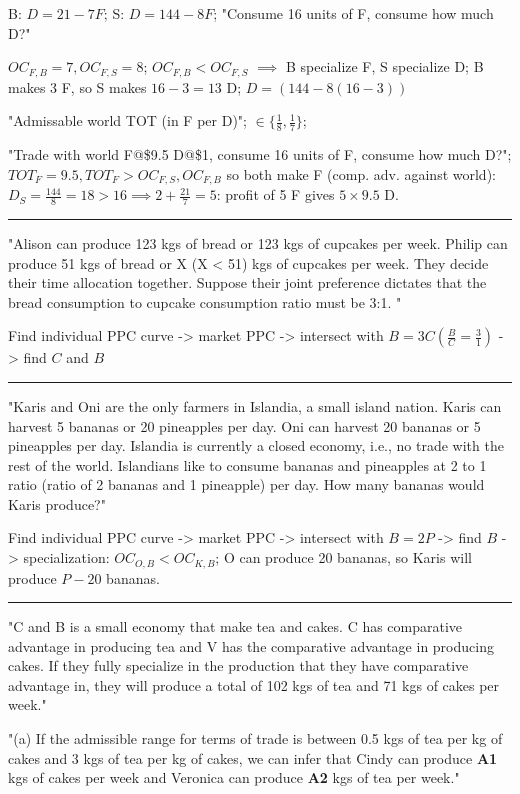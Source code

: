 \documentclass[a4paper]{article}
\begin{document}
\begin{multicols*}{3}
    B: $D = 21 − 7F$; S: $D = 144 - 8F$; "Consume 16 units of F, consume how much D?"


    $OC_{F,B}=7, OC_{F,S}=8$; $OC_{F,B} < OC_{F,S}$ $\implies$ B specialize F, S specialize D; B makes 3 F, so S makes $16-3=13$ D; $D=(144-8(16-3))$

    "Admissable world TOT (in F per D)"; $\in \{\frac{1}{8}, \frac{1}{7}\}$;

    "Trade with world F@\$9.5 D@\$1, consume 16 units of F, consume how much D?"; $TOT_F=9.5, TOT_F>OC_{F,S},OC_{F,B}$ so both make F (comp. adv. against world): $D_S=\frac{144}{8}=18>16 \implies 2 + \frac{21}{7} = 5$: profit of 5 F gives $5\times9.5$ D.

    \rule{1\linewidth}{0.4pt}

    "Alison can produce 123 kgs of bread or 123 kgs of cupcakes per week. Philip can produce 51 kgs of bread or X (X < 51) kgs of cupcakes per week. They decide their time allocation together. Suppose their joint preference dictates that the bread consumption to cupcake consumption ratio must be 3:1. "

    Find individual PPC curve -> market PPC -> intersect with $B=3C (\frac{B}{C}=\frac31)$ -> find $C$ and $B$

    \rule{1\linewidth}{0.4pt}

    "Karis and Oni are the only farmers in Islandia, a small island nation. Karis can harvest 5 bananas or 20 pineapples per day. Oni can harvest 20 bananas or 5 pineapples per day. Islandia is currently a closed economy, i.e., no trade with the rest of the world. Islandians like to consume bananas and pineapples at 2 to 1 ratio (ratio of 2 bananas and 1 pineapple) per day. How many bananas would Karis produce?"

    Find individual PPC curve -> market PPC -> intersect with $B=2P$ -> find $B$ -> specialization: $OC_{O,B} < OC_{K,B}$; O can produce 20 bananas, so Karis will produce $P-20$ bananas.

    \rule{1\linewidth}{0.4pt}

    "C and B is a small economy that make tea and cakes. C has comparative advantage in producing tea and V has the comparative advantage in producing cakes. If they fully specialize in the production that they have comparative advantage in, they will produce a total of 102 kgs of tea and 71 kgs of cakes per week."

    "(a) If the admissible range for terms of trade is between 0.5 kgs of tea per kg of cakes and 3 kgs of tea per kg of cakes, we can infer that Cindy can produce \textbf{A1} kgs of cakes per week and Veronica can produce \textbf{A2} kgs of tea per week."


\end{multicols*}
\end{document}
